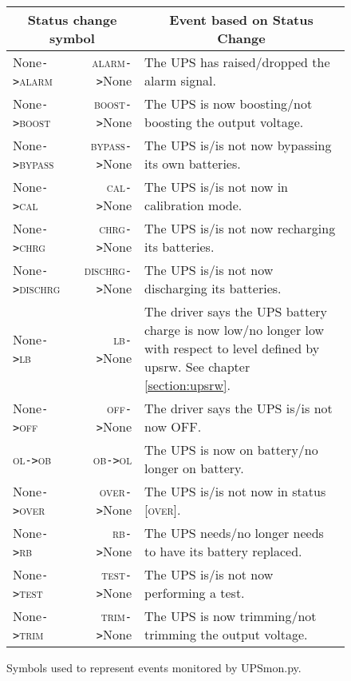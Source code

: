 \documentclass[12pt]{article}
\newcommand{\upsrw}{\mbox{\textcolor{UPSMONCOLOUR}{upsrw}}}
\newcommand{\UPSmon}{\mbox{\textcolor{UPSMONCOLOUR}{UPSmon.py}}}
\newcommand{\ALARM}{\textcolor{UPSDCOLOUR}{\textsc{alarm}}}
\newcommand{\BOOST}{\textcolor{UPSDCOLOUR}{\textsc{boost}}}
\newcommand{\BYPASS}{\textcolor{UPSDCOLOUR}{\textsc{bypass}}}
\newcommand{\CAL}{\textcolor{UPSDCOLOUR}{\textsc{cal}}}
\newcommand{\CHRG}{\textcolor{UPSDCOLOUR}{\textsc{chrg}}}
\newcommand{\DISCHRG}{\textcolor{UPSDCOLOUR}{\textsc{dischrg}}}
\newcommand{\LB}{\textcolor{UPSDCOLOUR}{\textsc{lb}}}
\newcommand{\OB}{\textcolor{UPSDCOLOUR}{\textsc{ob}}}
\newcommand{\OFF}{\textcolor{UPSDCOLOUR}{\textsc{off}}}
\newcommand{\OL}{\textcolor{UPSDCOLOUR}{\textsc{ol}}}
\newcommand{\OVER}{\textcolor{UPSDCOLOUR}{\textsc{over}}}
\newcommand{\RB}{\textcolor{UPSDCOLOUR}{\textsc{rb}}}
\newcommand{\TEST}{\textcolor{UPSDCOLOUR}{\textsc{test}}}
\newcommand{\TRIM}{\textcolor{UPSDCOLOUR}{\textsc{trim}}}
\newcommand{\None}{\textcolor{UPSMONCOLOUR}{\textsf{None}}}
\newcommand{\status}[1]{\textcolor{UPSDCOLOUR}{[{#1}]}}
\newcommand{\EVENT}[2]{\textcolor{MONCOLOUR}{#1}{\allowbreak}\texttt{\textcolor{MONCOLOUR}{->}}{\allowbreak}\textcolor{MONCOLOUR}{#2}}
\begin{document}
\begin{figure}[ht]
\begin{center}
\begin{tabular}{|l|r|p{0.65\LinePrinterwidth}|}
\hline
\multicolumn{2}{|c|}{\textbf{Status change symbol}} & \multicolumn{1}{c|}{\textbf{Event based on Status Change}} \\ \hline\hline
\EVENT{\None}{\ALARM}   & \EVENT{\ALARM}{\None}     & The UPS has raised/dropped the alarm signal. \\ \hline
\EVENT{\None}{\BOOST}   & \EVENT{\BOOST}{\None}     & The UPS is now boosting/not boosting the output voltage. \\ \hline
\EVENT{\None}{\BYPASS}  & \EVENT{\BYPASS}{\None}    & The UPS is/is not now bypassing its own batteries. \\ \hline
\EVENT{\None}{\CAL}     & \EVENT{\CAL}{\None}       & The UPS is/is not now in calibration mode. \\ \hline
\EVENT{\None}{\CHRG}    & \EVENT{\CHRG}{\None}      & The UPS is/is not now recharging its batteries. \\ \hline
\EVENT{\None}{\DISCHRG} & \EVENT{\DISCHRG}{\None}   & The UPS is/is not now discharging its batteries. \\ \hline
\EVENT{\None}{\LB}      & \EVENT{\LB}{\None}        & The driver says the UPS battery charge is now low/no longer low
                                                      with respect to level defined by \upsrw.
                                                      See chapter \ref{section:upsrw}. \\ \hline
\EVENT{\None}{\OFF}     & \EVENT{\OFF}{\None}       & The driver says the UPS is/is not now OFF. \\ \hline
\EVENT{\OL}{\OB}        & \EVENT{\OB}{\OL}          & The UPS is now on battery/no longer on battery. \\ \hline
\EVENT{\None}{\OVER}    & \EVENT{\OVER}{\None}      & The UPS is/is not now in status \status{\OVER}. \\ \hline
\EVENT{\None}{\RB}      & \EVENT{\RB}{\None}        & The UPS needs/no longer needs to have its battery replaced. \\ \hline
\EVENT{\None}{\TEST}    & \EVENT{\TEST}{\None}      & The UPS is/is not now performing a test. \\ \hline
\EVENT{\None}{\TRIM}    & \EVENT{\TRIM}{\None}      & The UPS is now trimming/not trimming the output voltage. \\ \hline\hline
\end{tabular}
\caption{Symbols used to represent events monitored by \UPSmon.\label{fig:UPSmonEVENT}}
\end{center}
\end{figure}
\end{document}
